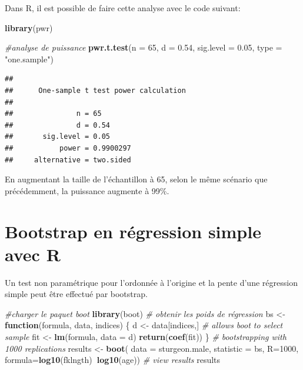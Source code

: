 \documentclass[12pt,]{book}
\newenvironment{Shaded}{\begin{snugshade}}{\end{snugshade}}
\newcommand{\CommentTok}[1]{\textcolor[rgb]{0.56,0.35,0.01}{\textit{#1}}}
\newcommand{\ControlFlowTok}[1]{\textcolor[rgb]{0.13,0.29,0.53}{\textbf{#1}}}
\newcommand{\DataTypeTok}[1]{\textcolor[rgb]{0.13,0.29,0.53}{#1}}
\newcommand{\DecValTok}[1]{\textcolor[rgb]{0.00,0.00,0.81}{#1}}
\newcommand{\FloatTok}[1]{\textcolor[rgb]{0.00,0.00,0.81}{#1}}
\newcommand{\KeywordTok}[1]{\textcolor[rgb]{0.13,0.29,0.53}{\textbf{#1}}}
\newcommand{\NormalTok}[1]{#1}
\newcommand{\OperatorTok}[1]{\textcolor[rgb]{0.81,0.36,0.00}{\textbf{#1}}}
\newcommand{\StringTok}[1]{\textcolor[rgb]{0.31,0.60,0.02}{#1}}
\begin{document}
Dans R, il est possible de faire cette analyse avec le code suivant:

\begin{Shaded}
\begin{Highlighting}[]
\KeywordTok{library}\NormalTok{(pwr)}

\CommentTok{#analyse de puissance}
\KeywordTok{pwr.t.test}\NormalTok{(}\DataTypeTok{n =} \DecValTok{65}\NormalTok{, }\DataTypeTok{d =} \FloatTok{0.54}\NormalTok{, }\DataTypeTok{sig.level =} \FloatTok{0.05}\NormalTok{, }\DataTypeTok{type =} \StringTok{"one.sample"}\NormalTok{)}
\end{Highlighting}
\end{Shaded}

\begin{verbatim}
## 
##      One-sample t test power calculation 
## 
##               n = 65
##               d = 0.54
##       sig.level = 0.05
##           power = 0.9900297
##     alternative = two.sided
\end{verbatim}

En augmentant la taille de l'échantillon à 65, selon le même scénario que précédemment, la puissance augmente à 99\%.

\hypertarget{bootstrap-en-ruxe9gression-simple-avec-r}{%
\section{Bootstrap en régression simple avec R}\label{bootstrap-en-ruxe9gression-simple-avec-r}}

Un test non paramétrique pour l'ordonnée à l'origine et la pente d'une régression simple peut être effectué par bootstrap.

\begin{Shaded}
\begin{Highlighting}[]
\CommentTok{#charger le paquet boot}
\KeywordTok{library}\NormalTok{(boot)}
\CommentTok{# obtenir les poids de régression}
\NormalTok{bs <-}\StringTok{ }\ControlFlowTok{function}\NormalTok{(formula, data, indices) \{}
\NormalTok{  d <-}\StringTok{ }\NormalTok{data[indices,] }\CommentTok{# allows boot to select sample}
\NormalTok{  fit <-}\StringTok{ }\KeywordTok{lm}\NormalTok{(formula, }\DataTypeTok{data =}\NormalTok{ d)}
  \KeywordTok{return}\NormalTok{(}\KeywordTok{coef}\NormalTok{(fit))}
\NormalTok{\}}
\CommentTok{# bootstrapping with 1000 replications}
\NormalTok{results <-}\StringTok{ }\KeywordTok{boot}\NormalTok{(}
  \DataTypeTok{data =}\NormalTok{ sturgeon.male,}
  \DataTypeTok{statistic =}\NormalTok{ bs,}
  \DataTypeTok{R=}\DecValTok{1000}\NormalTok{, }\DataTypeTok{formula=}\KeywordTok{log10}\NormalTok{(fklngth)}\OperatorTok{~}\KeywordTok{log10}\NormalTok{(age))}
\CommentTok{# view results}
\NormalTok{results}
\end{Highlighting}
\end{Shaded}
\end{document}
